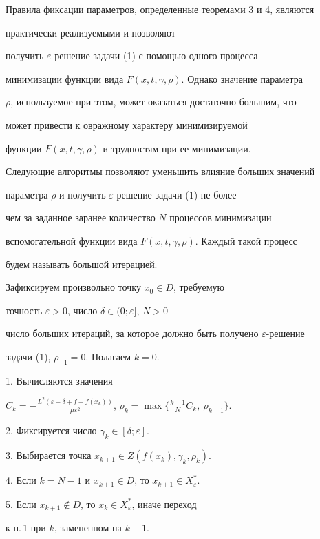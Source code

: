 Правила фиксации параметров, определенные теоремами 3 и 4, являются


практически реализуемыми и позволяют


получить $\varepsilon$-решение задачи (1) с помощью одного процесса


минимизации функции вида $F(x,t,\gamma,\rho)$. Однако значение параметра 


$\rho$, используемое при этом, может оказаться достаточно большим, что 


может привести к овражному характеру минимизируемой 


функции $F(x,t,\gamma,\rho)$ и трудностям при ее минимизации.


Следующие алгоритмы позволяют уменьшить влияние больших значений


параметра $\rho$ и получить $\varepsilon$-решение задачи (1) не более


чем за заданное заранее количество $N$ процессов минимизации


вспомогательной функции вида $F(x,t,\gamma,\rho)$. Каждый такой процесс


будем называть большой итерацией.





\begin{alg}


Зафиксируем произвольно точку $x_0\in D$, требуемую


точность $\varepsilon>0$, число $\delta\in(0;\varepsilon]$, $N>0$ ---


число больших итераций, за которое должно быть получено $\varepsilon$-решение


задачи (1), $\rho_{-1}=0$. Полагаем $k=0$.





1. Вычисляются значения


$C_k=-\frac{L^2(\varepsilon+\delta+\underline{f}-f(x_k))}{\mu\varepsilon


^2}$, $\rho_k=\max\{\frac{k+1}{N}C_k,\ \rho_{k-1}\}$. 





2. Фиксируется число $\gamma_k\in [\delta; \varepsilon]$.





3. Выбирается точка $x_{k+1}\in Z(f(x_k),\gamma_k,\rho_k)$.





4. Если $k=N-1$ и $x_{k+1}\in D$, то $x_{k+1}\in X_{\varepsilon}^*$.





5. Если $x_{k+1}\notin D$, то $x_k\in X_{\varepsilon}^*$, иначе переход


к п.\,1 при $k$, замененном на $k+1$.


\end{alg}





